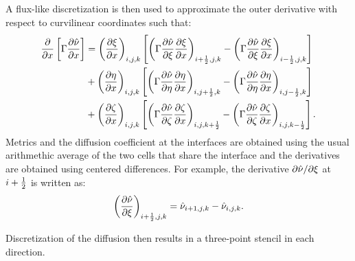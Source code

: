A flux-like discretization is then used to approximate the outer derivative with respect to curvilinear coordinates such that:
\begin{align*}
    \pdiff{}{x}\left[\Gamma\pdiff{\sa}{x}\right] &=
    \left(\pdiff{\xi}{x}\right)_{i,j,k}\left[
        \left(
            \Gamma\pdiff{\sa}{\xi}\pdiff{\xi}{x}
        \right)_{i+\half,j,k}
        - 
        \left(
            \Gamma\pdiff{\sa}{\xi}\pdiff{\xi}{x}
        \right)_{i-\half,j,k}
    \right]
    \\
    &+
    \left(\pdiff{\eta}{x}\right)_{i,j,k}\left[
        \left(
            \Gamma\pdiff{\sa}{\eta}\pdiff{\eta}{x}
        \right)_{i,j+\half,k}
        - 
        \left(
            \Gamma\pdiff{\sa}{\eta}\pdiff{\eta}{x}
        \right)_{i,j-\half,k}
    \right]
    \\
    &+
    \left(\pdiff{\zeta}{x}\right)_{i,j,k}\left[
        \left(
            \Gamma\pdiff{\sa}{\zeta}\pdiff{\zeta}{x}
        \right)_{i,j,k+\half}
        - 
        \left(
            \Gamma\pdiff{\sa}{\zeta}\pdiff{\zeta}{x}
        \right)_{i,j,k-\half}
    \right].
\end{align*}
Metrics and the diffusion coefficient at the interfaces are obtained using the usual arithmethic average of the two cells that share the interface and the derivatives are obtained using centered differences. For example, the derivative $\partial \sa/\partial \xi$ at $i + \frac{1}{2}$ is written as:
\begin{equation*}
    \left(\pdiff{\sa}{\xi}\right)_{i+\half,j,k} =
    \sa_{i+1,j,k} - \sa_{i,j,k}.
\end{equation*}

Discretization of the diffusion then results in a three-point stencil in each direction.
%
